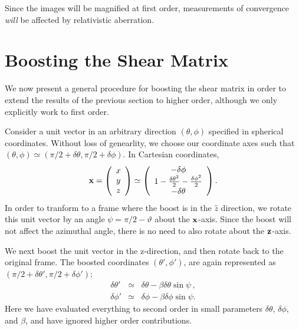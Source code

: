 \documentclass[useAMS,fleqn,usenatbib]{mn2e}
\begin{document}
Since the images will be magnified at first order, measurements
of convergence {\it will} be affected by relativistic aberration.



\section{Boosting the Shear Matrix}
\label{shear}

We now present a general procedure for boosting the shear matrix in order to extend the results of the previous section to higher order, although we only explicitly work to first order.

Consider a unit vector  in an arbitrary direction $(\theta,\phi)$ specified in spherical coordinates.  Without loss of genearlity, we choose our coordinate axes such that 
$(\theta,\phi)\simeq(\pi/2+\delta\theta,\pi/2+\delta\phi)$.   In Cartesian coordinates,
\begin{equation}
{\bf x}=\left(\begin{array}{c}
x\\
y\\
z
\end{array}\right)\simeq\left(\begin{array}{c}
-\delta\phi\\
1-\frac{\delta\theta^{2}}{2}-\frac{\delta\phi^{2}}{2}\\
-\delta\theta
\end{array}\right).
\end{equation}
In order to tranform to a frame where the boost is in the $\hat z$ direction, we rotate this unit vector by an angle $\psi = \pi/2-\vartheta$ about the ${\bf x}$-axis. Since the boost will not affect the azimuthal angle, there is no need to also rotate about the ${\bf z}$-axis.

We next boost the unit vector in the z-direction, and then rotate back to the original frame.
The boosted coordinates $(\theta',\phi')$, are
again represented as
 $(\pi/2+\delta\theta',\pi/2+\delta\phi')$:
\begin{eqnarray}
\delta\theta' & \simeq &\delta\theta-\beta\delta\theta\sin\psi\,,\\
\delta\phi' & \simeq & \delta\phi-\beta\delta\phi\sin\psi.
\end{eqnarray}
Here we have evaluated everything to second order in small parameters
$\delta\theta$, $\delta\phi$, and $\beta$, and have ignored higher order contributions.
\end{document}
